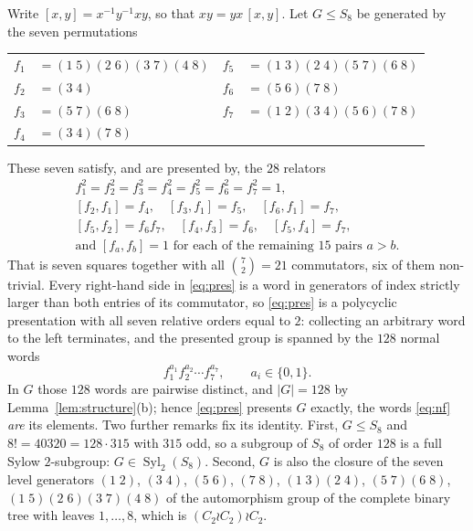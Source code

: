 \documentclass[11pt]{amsart}
\theoremstyle{remark}
\DeclareMathOperator{\Syl}{Syl}
\begin{document}
Write $[x,y]=x^{-1}y^{-1}xy$, so that $xy=yx\,[x,y]$. Let $G\le S_8$ be generated by the
seven permutations
\begin{center}
\begin{tabular}{ll@{\qquad}ll}
$f_1$ & $=(1\;5)(2\;6)(3\;7)(4\;8)$ & $f_5$ & $=(1\;3)(2\;4)(5\;7)(6\;8)$\\
$f_2$ & $=(3\;4)$                   & $f_6$ & $=(5\;6)(7\;8)$\\
$f_3$ & $=(5\;7)(6\;8)$             & $f_7$ & $=(1\;2)(3\;4)(5\;6)(7\;8)$\\
$f_4$ & $=(3\;4)(7\;8)$             &       &
\end{tabular}
\end{center}
These seven satisfy, and are presented by, the $28$ relators
\begin{equation}\label{eq:pres}
\begin{gathered}
 f_1^2=f_2^2=f_3^2=f_4^2=f_5^2=f_6^2=f_7^2=1,\\
 [f_2,f_1]=f_4,\quad [f_3,f_1]=f_5,\quad [f_6,f_1]=f_7,\\
 [f_5,f_2]=f_6f_7,\quad [f_4,f_3]=f_6,\quad [f_5,f_4]=f_7,\\
 \text{and }[f_a,f_b]=1\text{ for each of the remaining }15\text{ pairs }a>b.
\end{gathered}
\end{equation}
That is seven squares together with all $\binom72=21$ commutators, six of them non-trivial.
Every right-hand side in \eqref{eq:pres} is a word in generators of index strictly larger
than both entries of its commutator, so \eqref{eq:pres} is a polycyclic presentation with
all seven relative orders equal to $2$: collecting an arbitrary word to the left terminates,
and the presented group is spanned by the $128$ normal words
\begin{equation}\label{eq:nf}
 f_1^{a_1}f_2^{a_2}\cdots f_7^{a_7},\qquad a_i\in\{0,1\}.
\end{equation}
In $G$ those $128$ words are pairwise distinct, and $|G|=128$ by
Lemma~\ref{lem:structure}(b); hence \eqref{eq:pres} presents $G$ exactly, the words
\eqref{eq:nf} \emph{are} its elements. Two further remarks fix its identity. First, $G\le S_8$ and $8!=40320=128\cdot315$ with
$315$ odd, so a subgroup of $S_8$ of order $128$ is a full Sylow $2$-subgroup: $G\in
\Syl_2(S_8)$. Second, $G$ is also the closure of the seven level generators
$(1\;2)$, $(3\;4)$, $(5\;6)$, $(7\;8)$, $(1\;3)(2\;4)$, $(5\;7)(6\;8)$,
$(1\;5)(2\;6)(3\;7)(4\;8)$ of the automorphism group of the complete binary tree with
leaves $1,\dots,8$, which is $(C_2\wr C_2)\wr C_2$.
\end{document}
